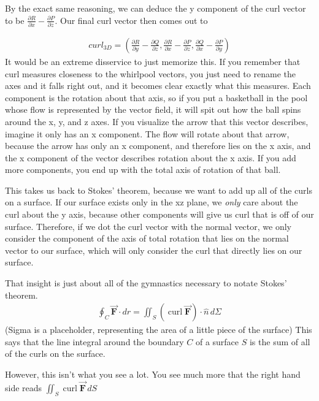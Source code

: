 \documentclass[12pt, letterpaper]{article}
\begin{document}
By the exact same reasoning, we can deduce the y component of the curl vector to be $\frac{\partial R}{\partial x} - \frac{\partial P}{\partial z}$.
Our final curl vector then comes out to 

\begin{gather*}
    curl_{3D} = \left( \frac{\partial R}{\partial y} - \frac{\partial Q}{\partial z}, \frac{\partial R}{\partial x} - \frac{\partial P}{\partial z}, \frac{\partial Q}{\partial x} - \frac{\partial P}{\partial y} \right)
\end{gather*}
It would be an extreme disservice to just memorize this.
If you remember that curl measures closeness to the whirlpool vectors, you just need to rename the axes and it falls right out,
and it becomes clear exactly what this measures.
Each component is the rotation about that axis, so if you put a basketball in the pool whose flow is represented by the vector field, it will spit out how the ball spins around the x, y, and z axes.
If you visualize the arrow that this vector describes, imagine it only has an x component.
The flow will rotate about that arrow, because the arrow has only an x component, and therefore lies on the x axis, and the x component of the vector describes rotation about the x axis.
If you add more components, you end up with the total axis of rotation of that ball.

This takes us back to Stokes' theorem, because we want to add up all of the curls on a surface.
If our surface exists only in the xz plane, we \emph{only} care about the curl about the y axis, because other components will give us curl that is off of our surface.
Therefore, if we dot the curl vector with the normal vector, we only consider the component of the axis of total rotation that lies on the normal vector to our surface,
which will only consider the curl that directly lies on our surface.

That insight is just about all of the gymnastics necessary to notate Stokes' theorem.
\begin{gather*}
    \oint_C \vec{\mathbf{F}} \cdot dr = \iint_S \left(\operatorname{curl} \vec{\mathbf{F}} \right) \cdot \hat{n} \, d\Sigma
\end{gather*}
(Sigma is a placeholder, representing the area of a little piece of the surface)
This says that the line integral around the boundary $C$ of a surface $S$ is the sum of all of the curls on the surface.

However, this isn't what you see a lot.
You see much more that the right hand side reads $\iint_S \operatorname{curl} \vec{\mathbf{F}} \, dS$
\end{document}
